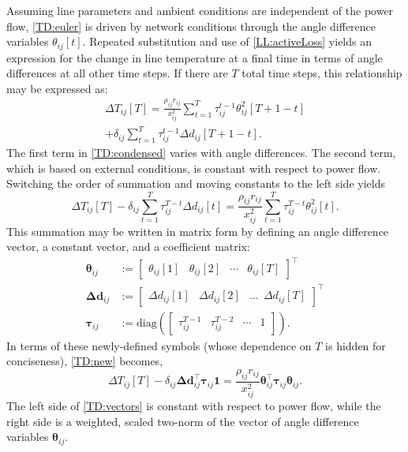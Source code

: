 \documentclass[conference]{IEEEtran}
\begin{document}
Assuming line parameters and ambient conditions are independent of the
power flow, \eqref{TD:euler} is driven by network conditions through
the angle difference variables $\theta_{ij}[t]$. Repeated substitution
and use of \eqref{LL:activeLoss} yields an expression for the change
in line temperature at a final time in terms of angle differences at
all other time steps. If there are $T$ total time steps, this
relationship may be expressed as:
\begin{multline}
\label{TD:condensed}
\Delta T_{ij}[T] = \frac{\rho_{ij} r_{ij}}{x_{ij}^2}\sum_{t=1}^{T}\tau_{ij}^{t-1}\theta_{ij}^2[T+1-t] \\
+ \delta_{ij} \sum_{t=1}^{T}\tau_{ij}^{t-1}\Delta d_{ij} [T+1 - t].
\end{multline}
The first term in \eqref{TD:condensed} varies with angle
differences. The second term, which is based on external conditions,
is constant with respect to power flow. Switching the order of
summation and moving constants to the left side yields
\begin{equation}
\label{TD:new}
\Delta T_{ij}[T] - \delta_{ij} \sum_{t=1}^{T}\tau_{ij}^{T-t}\Delta d_{ij} [t]
 = \frac{\rho_{ij}r_{ij}}{x_{ij}^2} \sum_{t=1}^{T} \tau_{ij}^{T-t}\theta_{ij}^2[t].
\end{equation}
This summation may be written in matrix form by defining an angle
difference vector, a constant vector, and a coefficient matrix:
\begin{subequations}\label{TD:matvec}
\begin{align}
\boldsymbol{\theta}_{ij} &:= \begin{bmatrix}\theta_{ij}[1] & \theta_{ij}[2] & \cdots & \theta_{ij}[T] \end{bmatrix}^\top \\
\boldsymbol{\Delta d}_{ij} &:= \begin{bmatrix}
\Delta d_{ij}[1] & \Delta d_{ij}[2] & \ldots ~~ \Delta d_{ij}[T] 
\end{bmatrix}^\top \\
\boldsymbol{\tau}_{ij} &:= \text{diag}\left(\begin{bmatrix} \tau_{ij}^{T-1} & \tau_{ij}^{T-2} & \cdots & 1 \end{bmatrix}\right).
\end{align}
\end{subequations}
In terms of these newly-defined symbols (whose dependence on $T$ is hidden for conciseness), \eqref{TD:new} becomes,
\begin{equation}
\label{TD:vectors}
\Delta T_{ij}[T] - \delta_{ij} \boldsymbol{\Delta d}_{ij}^\top \boldsymbol{\tau}_{ij}\mathbf{1} = \frac{\rho_{ij}r_{ij}}{x_{ij}^2} \boldsymbol{\theta}_{ij}^\top \boldsymbol{\tau}_{ij}\boldsymbol{\theta}_{ij}.
\end{equation}
The left side of \eqref{TD:vectors} is constant with respect to power flow, while the right side is a weighted, scaled two-norm of the vector of angle difference variables $\boldsymbol{\theta}_{ij}$.
\end{document}
